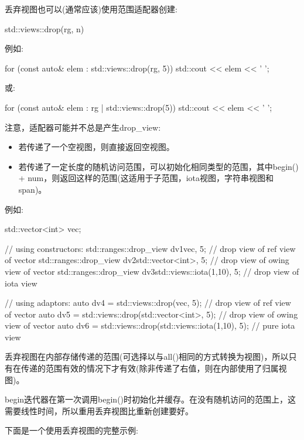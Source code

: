 
丢弃视图也可以(通常应该)使用范围适配器创建:

\begin{cpp}
std::views::drop(rg, n)
\end{cpp}

例如:

\begin{cpp}
for (const auto& elem : std::views::drop(rg, 5)) {
	std::cout << elem << ' ';
}
\end{cpp}

或:

\begin{cpp}
for (const auto& elem : rg | std::views::drop(5)) {
	std::cout << elem << ' ';
}
\end{cpp}

注意，适配器可能并不总是产生drop\_view:

\begin{itemize}
\item
若传递了一个空视图，则直接返回空视图。

\item
若传递了一定长度的随机访问范围，可以初始化相同类型的范围，其中begin() + num，则返回这样的范围(这适用于子范围，iota视图，字符串视图和span)。
\end{itemize}

例如:

\begin{cpp}
std::vector<int> vec;

// using constructors:
std::ranges::drop_view dv1{vec, 5}; // drop view of ref view of vector
std::ranges::drop_view dv2{std::vector<int>{}, 5}; // drop view of owing view of vector
std::ranges::drop_view dv3{std::views::iota(1,10), 5}; // drop view of iota view

// using adaptors:
auto dv4 = std::views::drop(vec, 5); // drop view of ref view of vector
auto dv5 = std::views::drop(std::vector<int>{}, 5); // drop view of owing view of vector
auto dv6 = std::views::drop(std::views::iota(1,10), 5); // pure iota view
\end{cpp}

丢弃视图在内部存储传递的范围(可选择以与all()相同的方式转换为视图)，所以只有在传递的范围有效的情况下才有效(除非传递了右值，则在内部使用了归属视图)。

begin迭代器在第一次调用begin()时初始化并缓存。在没有随机访问的范围上，这需要线性时间，所以重用丢弃视图比重新创建要好。

下面是一个使用丢弃视图的完整示例:

